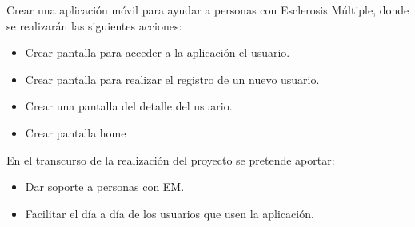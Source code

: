 

Crear una aplicación móvil para ayudar a personas con Esclerosis Múltiple, donde se realizarán las siguientes acciones:
\begin{itemize}
	\item Crear pantalla para acceder a la aplicación el usuario.
	\item Crear pantalla para realizar el registro de un nuevo usuario.
	\item Crear una pantalla del detalle del usuario.
	\item Crear pantalla home
\end{itemize}

En el transcurso de la realización del proyecto se pretende aportar:
\begin{itemize}
	\item Dar soporte a personas con EM.
	\item Facilitar el día a día de los usuarios que usen la aplicación.
\end{itemize}


